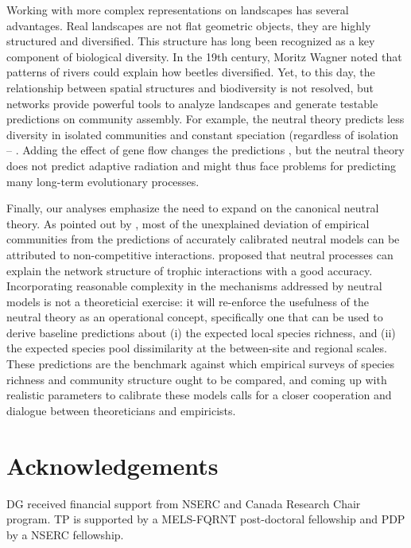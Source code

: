 \documentclass[12pt]{article}
\begin{document}
Working with more complex representations on landscapes has several advantages.
Real landscapes are not flat geometric objects, they are highly structured and
diversified. This structure has long been recognized as a key component of
biological diversity. In the 19th century, Moritz Wagner noted that patterns of
rivers \parencite{coy04} could explain how beetles diversified. Yet, to this day, the
relationship between spatial structures and biodiversity is not resolved, but
networks provide powerful tools to analyze landscapes and generate testable
predictions on community assembly. For example, the neutral theory predicts less
diversity in isolated communities and constant speciation (regardless of
isolation -- \parencite{Economo2008}. Adding the effect of gene flow changes the
predictions \parencite{Desjardins2012b}, but the neutral theory does not predict
adaptive radiation and might thus face problems for predicting many long-term
evolutionary processes.

Finally, our analyses emphasize the need to expand on the canonical neutral
theory. As pointed out by \textcite{Wootton2005}, most of the unexplained
deviation of empirical communities from the predictions of accurately calibrated
neutral models can be attributed to non-competitive interactions. \textcite{Canard2012}
proposed that neutral processes can explain the network structure of trophic
interactions with a good accuracy. Incorporating reasonable complexity in the
mechanisms addressed by neutral models is not a theoreticial exercise: it will
re-enforce the usefulness of the neutral theory as an operational concept,
specifically one that can be used to derive baseline predictions about (i) the
expected local species richness, and (ii) the expected species pool
dissimilarity at the between-site and regional scales. These predictions are the
benchmark against which empirical surveys of species richness and community
structure ought to be compared, and coming up with realistic parameters to
calibrate these models calls for a closer cooperation and dialogue between
theoreticians and empiricists.

\section*{Acknowledgements}
DG received financial support from NSERC and Canada Research Chair program. TP
is supported by a MELS-FQRNT post-doctoral fellowship and PDP by a NSERC
fellowship.
\newpage
\end{document}
